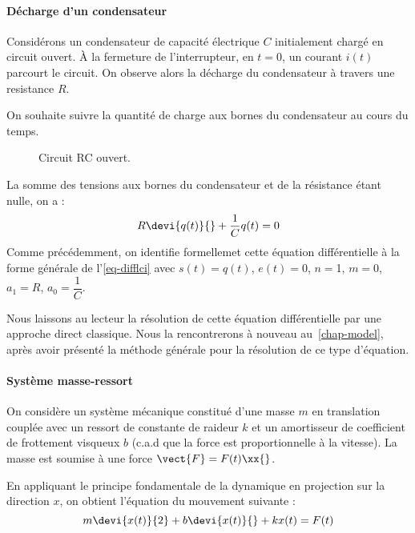 \paragraph{Décharge d'un condensateur}

Considérons un condensateur de capacité électrique $C$ 
initialement chargé en circuit ouvert.
À la fermeture de l'interrupteur, en $t=0$, 
un courant $i(t)$ parcourt le circuit.
On observe alors la décharge du condensateur à travers une resistance $R$. 

On souhaite suivre la quantité de charge aux bornes du condensateur au 
cours du temps.
\begin{figure}[!h]      
    \centering
    
    \caption{Circuit RC ouvert.\label{fig-decharge_condensateur}}
\end{figure}

La somme des tensions aux bornes du condensateur et de la résistance étant nulle, on a :
\begin{align*}
    R\devi{q(t)}{}+\dfrac{1}{C}q(t)=0 
\end{align*}
Comme précédemment, on identifie formellemet cette équation différentielle 
à la forme générale de l'\cref{eq-difflci} avec $s(t)=q(t)$, $e(t)=0$, 
$n=$1, $m=0$, $a_1=R$, $a_0=\dfrac{1}{C}$.

Nous laissons au lecteur la résolution de cette équation différentielle par une approche direct classique.
Nous la rencontrerons à nouveau au~\cref{chap-model}, après avoir 
présenté la méthode générale pour la résolution de ce type d'équation.

\paragraph{Système masse-ressort}

On considère un système mécanique constitué d'une masse $m$ en translation couplée avec un ressort de constante
de raideur $k$ et un amortisseur de coefficient de frottement visqueux $b$ (c.a.d que la force est 
proportionnelle à la vitesse). 
La masse est soumise à une force $\vect{F}=F(t)\xx{}$.

En appliquant le principe fondamentale de la dynamique en projection sur la direction $x$,
on obtient l'équation du mouvement suivante :                                                                                 
$$                                                                                                                            
m\devi{x(t)}{2}+b\devi{x(t)}{}+kx(t)=F(t)
$$ 

